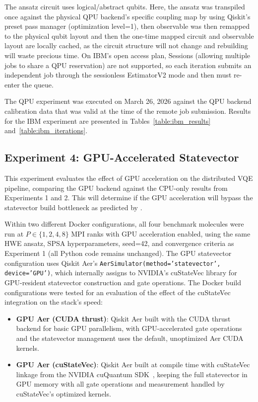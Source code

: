 The ansatz circuit uses logical/abstract qubits. Here, the ansatz was transpiled once against the physical QPU backend's specific coupling map by using Qiskit's preset pass 
manager (optimization level=1), then observable was then remapped to the physical qubit layout and then the one-time mapped circuit and observable layout are locally cached, 
as the circuit structure will not change and rebuilding will waste precious time. On IBM's 
open access plan, Sessions (allowing multiple jobs to share a QPU reservation) are not supported, so each iteration submits an independent job through the 
sessionless EstimatorV2 mode and then must re-enter the queue.    

The QPU experiment was executed on March 26, 2026 against the QPU backend calibration data that was valid at the time of the remote
job submission. Results for the IBM experiment are presented in Tables~\ref{table:ibm_results} and~\ref{table:ibm_iterations}.

\subsection{Experiment 4: GPU-Accelerated Statevector}
This experiment evaluates the effect of GPU acceleration on the distributed VQE pipeline, comparing the GPU 
backend against the CPU-only results from Experiments 1 and 2. This will determine if the GPU acceleration will bypass the statevector build bottleneck as predicted by \textcite{bayraktar2023cuquantum}. 

Within two different Docker configurations, all four benchmark molecules were run at $P \in \{1,2,4,8\}$ MPI ranks with GPU acceleration enabled, using the same HWE ansatz, SPSA hyperparameters, seed=42, and convergence criteria as Experiment 1 (all Python code remains unchanged). 
The GPU statevector configuration uses Qiskit Aer's \texttt{AerSimulator(method='statevector', device='GPU')}, which internally assigns to NVIDIA's cuStateVec library for GPU-resident statevector 
construction and gate operations. The Docker build configurations were tested for an evaluation of the effect of the cuStateVec integration on the stack's speed:
\begin{itemize}
    \item \textbf{GPU Aer (CUDA thrust)}: Qiskit Aer built with the CUDA thrust backend for basic GPU parallelism, with GPU-accelerated gate operations and the statevector management uses the default, unoptimized Aer CUDA kernels.
    \item \textbf{GPU Aer (cuStateVec)}: Qiskit Aer built at compile time with cuStateVec linkage from the NVIDIA cuQuantum SDK~\parencite{bayraktar2023cuquantum}, keeping the full statevector in GPU memory with all gate operations and measurement handled by cuStateVec's optimized kernels.
\end{itemize}

